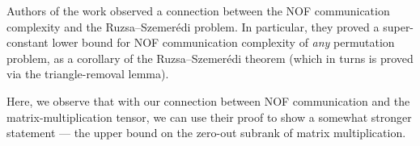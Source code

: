 Authors of the work \cite{LPS17} observed a connection between the NOF communication complexity and the Ruzsa–Szemerédi problem. In particular, they proved a super-constant lower bound for NOF communication complexity of \emph{any} permutation problem, as a corollary of the Ruzsa–Szemerédi theorem (which in turns is proved via the triangle-removal lemma).


Here, we observe that with our connection between NOF communication and the matrix-multiplication tensor, we can use their proof to show a somewhat stronger statement --- the upper bound on the zero-out subrank of matrix multiplication.



